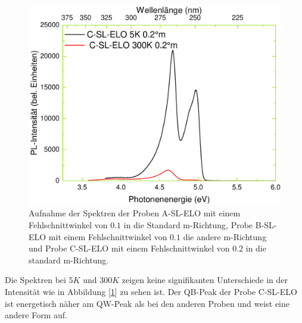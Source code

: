 \begin{figure}[htb]
\begin{minipage}[t]{0.4\textwidth}
    \includegraphics[width=\linewidth]{Bilder/TS4048/cslelo.pdf}
  \end{minipage}
	\caption{Aufnahme der Spektren der Proben A-SL-ELO mit einem Fehlschnittwinkel von $0.1$ in die Standard m-Richtung, Probe B-SL-ELO mit einem Fehlschnittwinkel von $0.1$ die andere m-Richtung und Probe C-SL-ELO mit einem Fehlschnittwinkel von $0.2$ in die standard m-Richtung. }
	\label{fig:spectrassl}
\end{figure}
\noindent 
%
Die Spektren bei $5K$ und $300K$ zeigen keine signifikanten Unterschiede in der Intensität wie in Abbildung [\ref{fig:spectrassl}] zu sehen ist. Der QB-Peak der Probe C-SL-ELO ist energetisch näher am QW-Peak als bei den anderen Proben und weist eine andere Form auf. 
%
